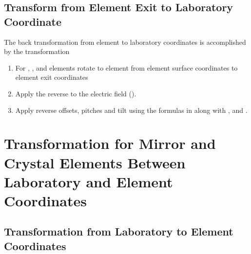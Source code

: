 \subsection{Transform from Element Exit to Laboratory Coordinate}

The back transformation from element to laboratory coordinates is
accomplished by the transformation
  \begin{enumerate}
  \item
For , , and  elements
rotate to element from element surface coordinates to element exit coordinates
  \item
Apply the reverse  to the electric field ().
  \item
Apply reverse offsets, pitches and tilt using the formulas in
 along with , and .
  \end{enumerate}

\section[Mirror and Crystal Element Transformation]
{Transformation for Mirror and Crystal Elements Between 
Laboratory and Element Coordinates}
\label{s:photon.lab.ele}


\subsection{Transformation from Laboratory to Element Coordinates}
\label{s:crystal.trans.le}


